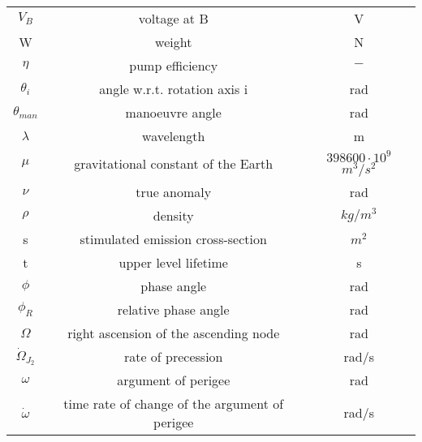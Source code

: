 \begin{center}
\begin{longtable}{c|c|c}
$V_B$ 															& voltage at B 																& V \\

W 																	& weight 																			& N \\

$\eta$ 															& pump efficiency 														& $-$ \\

$\theta _i$ 												& angle w.r.t. rotation axis i 								& rad \\

$\theta _{man}$ 										& manoeuvre angle 														& rad \\

$\lambda$ 													& wavelength																	& m \\

$\mu$														 		& gravitational constant of the Earth 				& $398600\cdot 10^9$ $m^3/s^2$ \\

$\nu$ 															& true anomaly 																& rad \\

$\rho$ 															& density 																		& $kg/m^3$ \\

s 																	& stimulated emission cross-section 					& $m^2$ \\

t 																	& upper level lifetime 												& s \\

$\phi$ 															& phase angle 																& rad \\
	
$\phi _R$														& relative phase angle 												& rad \\
     
$\Omega$ 														& right ascension of the ascending node 			& rad \\

$\dot \Omega _{J_2 }$ 							& rate of precession 													& rad/s \\

$\omega$ 														& argument of perigee													& rad \\

$\dot \omega$ 											& time rate of change of the argument of perigee & rad/s\\
 
\end{longtable}
\end{center}